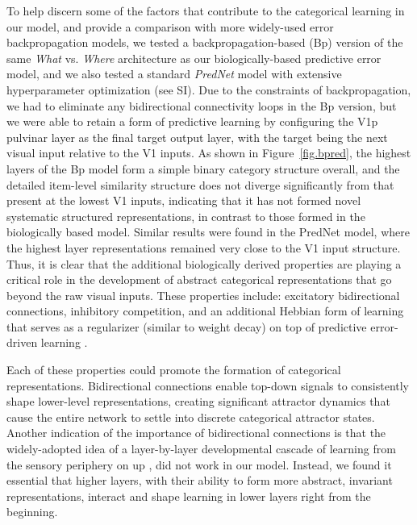\documentclass[11pt,twoside]{article}
\newif\myifpdf
\begin{document}
To help discern some of the factors that contribute to the categorical learning in our model, and provide a comparison with more widely-used error backpropagation models, we tested a backpropagation-based (Bp) version of the same \emph{What} vs. \emph{Where} architecture as our biologically-based predictive error model, and we also tested a standard \emph{PredNet} model \citep{LotterKreimanCox16} with extensive hyperparameter optimization (see SI).  Due to the constraints of backpropagation, we had to eliminate any bidirectional connectivity loops in the Bp version, but we were able to retain a form of predictive learning by configuring the V1p pulvinar layer as the final target output layer, with the target being the next visual input relative to the V1 inputs.  As shown in Figure~\ref{fig.bpred}, the highest layers of the Bp model form a simple binary category structure overall, and the detailed item-level similarity structure does not diverge significantly from that present at the lowest V1 inputs, indicating that it has not formed novel systematic structured representations, in contrast to those formed in the biologically based model.  Similar results were found in the PredNet model, where the highest layer representations remained very close to the V1 input structure.  Thus, it is clear that the additional biologically derived properties are playing a critical role in the development of abstract categorical representations that go beyond the raw visual inputs. These properties include: excitatory bidirectional connections, inhibitory competition, and an additional Hebbian form of learning that serves as a regularizer (similar to weight decay) on top of predictive error-driven learning \citep{OReilly98,OReillyMunakata00}.

Each of these properties could promote the formation of categorical representations. Bidirectional connections enable top-down signals to consistently shape lower-level representations, creating significant attractor dynamics that cause the entire network to settle into discrete categorical attractor states.  Another indication of the importance of bidirectional connections is that the widely-adopted idea of a layer-by-layer developmental cascade of learning from the sensory periphery on up \citep{ShragerJohnson96,BengioYaoAlainEtAl13,Valpola14,HintonSalakhutdinov06}, did not work in our model. 
Instead, we found it essential that higher layers, with their ability to form more abstract, invariant representations, interact and shape learning in lower layers right from the beginning.
\end{document}
